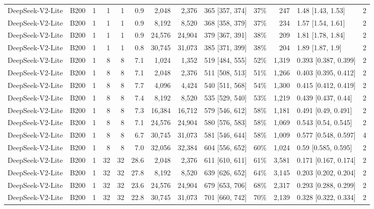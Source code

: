 \begin{landscape}
\begin{longtable}{llrrrrrrlrrlr}
\midrule
\endhead
\bottomrule
\endfoot
DeepSeek-V2-Lite & B200 & 1 & 1 & 1 & 0.9 & 2,048 & 2,376 & 365 {[}357, 374{]} & 37\% & 247 & 1.48 {[}1.43, 1.53{]} & 2 \\
DeepSeek-V2-Lite & B200 & 1 & 1 & 1 & 0.9 & 8,192 & 8,520 & 368 {[}358, 379{]} & 37\% & 234 & 1.57 {[}1.54, 1.61{]} & 2 \\
DeepSeek-V2-Lite & B200 & 1 & 1 & 1 & 0.9 & 24,576 & 24,904 & 379 {[}367, 391{]} & 38\% & 209 & 1.81 {[}1.78, 1.84{]} & 2 \\
DeepSeek-V2-Lite & B200 & 1 & 1 & 1 & 0.8 & 30,745 & 31,073 & 385 {[}371, 399{]} & 38\% & 204 & 1.89 {[}1.87, 1.9{]} & 2 \\
DeepSeek-V2-Lite & B200 & 1 & 8 & 8 & 7.1 & 1,024 & 1,352 & 519 {[}484, 555{]} & 52\% & 1,319 & 0.393 {[}0.387, 0.399{]} & 2 \\
DeepSeek-V2-Lite & B200 & 1 & 8 & 8 & 7.1 & 2,048 & 2,376 & 511 {[}508, 513{]} & 51\% & 1,266 & 0.403 {[}0.395, 0.412{]} & 2 \\
DeepSeek-V2-Lite & B200 & 1 & 8 & 8 & 7.7 & 4,096 & 4,424 & 540 {[}511, 568{]} & 54\% & 1,300 & 0.415 {[}0.412, 0.419{]} & 2 \\
DeepSeek-V2-Lite & B200 & 1 & 8 & 8 & 7.4 & 8,192 & 8,520 & 535 {[}529, 540{]} & 53\% & 1,219 & 0.439 {[}0.437, 0.44{]} & 2 \\
DeepSeek-V2-Lite & B200 & 1 & 8 & 8 & 7.3 & 16,384 & 16,712 & 579 {[}546, 612{]} & 58\% & 1,181 & 0.491 {[}0.49, 0.491{]} & 2 \\
DeepSeek-V2-Lite & B200 & 1 & 8 & 8 & 7.1 & 24,576 & 24,904 & 580 {[}576, 583{]} & 58\% & 1,069 & 0.543 {[}0.54, 0.545{]} & 2 \\
DeepSeek-V2-Lite & B200 & 1 & 8 & 8 & 6.7 & 30,745 & 31,073 & 581 {[}546, 644{]} & 58\% & 1,009 & 0.577 {[}0.548, 0.597{]} & 4 \\
DeepSeek-V2-Lite & B200 & 1 & 8 & 8 & 7.0 & 32,056 & 32,384 & 604 {[}556, 652{]} & 60\% & 1,024 & 0.59 {[}0.585, 0.595{]} & 2 \\
DeepSeek-V2-Lite & B200 & 1 & 32 & 32 & 28.6 & 2,048 & 2,376 & 611 {[}610, 611{]} & 61\% & 3,581 & 0.171 {[}0.167, 0.174{]} & 2 \\
DeepSeek-V2-Lite & B200 & 1 & 32 & 32 & 27.8 & 8,192 & 8,520 & 639 {[}626, 652{]} & 64\% & 3,145 & 0.203 {[}0.202, 0.204{]} & 2 \\
DeepSeek-V2-Lite & B200 & 1 & 32 & 32 & 23.6 & 24,576 & 24,904 & 679 {[}653, 706{]} & 68\% & 2,317 & 0.293 {[}0.288, 0.299{]} & 2 \\
DeepSeek-V2-Lite & B200 & 1 & 32 & 32 & 22.8 & 30,745 & 31,073 & 701 {[}660, 742{]} & 70\% & 2,139 & 0.328 {[}0.322, 0.334{]} & 2 \\

\end{longtable}
\end{landscape}
